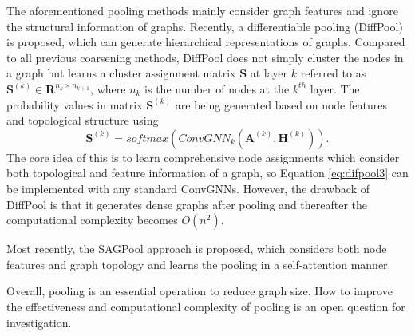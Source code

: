     The aforementioned pooling methods mainly consider graph features and ignore the structural information of graphs. Recently, a differentiable pooling (DiffPool) \cite{ying2018hierarchical} is proposed, which can generate hierarchical representations of graphs. 
    Compared to all previous coarsening methods, DiffPool does not simply cluster the nodes in a graph but learns a cluster assignment matrix $\mathbf{S}$ at layer $k$ referred to as $\mathbf{S}^{(k)} \in \mathbf{R}^{n_k \times n_{k+1}}$, where $n_k$ is the number of nodes at the $k^{th}$ layer. The probability values in matrix $\mathbf{S}^{(k)}$ are being generated based on node features and topological structure using
	\begin{equation}
	\label{eq:difpool3}
	\mathbf{S}^{(k)} = softmax(ConvGNN_k(\mathbf{A}^{(k)}, \mathbf{H}^{(k)})).
	\end{equation}
    The core idea of this is to learn comprehensive node assignments which consider both topological and feature information of a graph, so Equation \ref{eq:difpool3} can be implemented with any standard ConvGNNs. %
    However, the drawback of DiffPool is that it generates dense graphs after pooling and thereafter the computational complexity becomes $O(n^2)$. 
    
    Most recently, the SAGPool \cite{lee2019self} approach is proposed, which considers both node features and graph topology and learns the pooling in a self-attention manner. 
    
    Overall, pooling is an essential operation to reduce graph size. How to improve the effectiveness and computational complexity of pooling is an open question for investigation.
	
